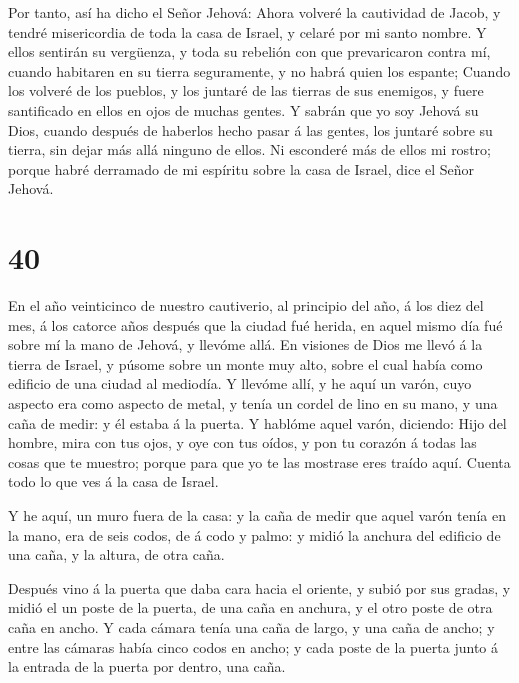  Por tanto, así ha dicho el Señor Jehová: Ahora volveré la
cautividad de Jacob, y tendré misericordia de toda la casa de Israel, y
celaré por mi santo nombre.  Y ellos sentirán su vergüenza,
y toda su rebelión con que prevaricaron contra mí, cuando habitaren en
su tierra seguramente, y no habrá quien los espante; 
Cuando los volveré de los pueblos, y los juntaré de las tierras de sus
enemigos, y fuere santificado en ellos en ojos de muchas gentes.
 Y sabrán que yo soy Jehová su Dios, cuando después de
haberlos hecho pasar á las gentes, los juntaré sobre su tierra, sin
dejar más allá ninguno de ellos.  Ni esconderé más de ellos
mi rostro; porque habré derramado de mi espíritu sobre la casa de
Israel, dice el Señor Jehová.

\hypertarget{section-39}{%
\section{40}\label{section-39}}

 En el año veinticinco de nuestro cautiverio, al principio
del año, á los diez del mes, á los catorce años después que la ciudad
fué herida, en aquel mismo día fué sobre mí la mano de Jehová, y llevóme
allá.  En visiones de Dios me llevó á la tierra de Israel, y
púsome sobre un monte muy alto, sobre el cual había como edificio de una
ciudad al mediodía.  Y llevóme allí, y he aquí un varón,
cuyo aspecto era como aspecto de metal, y tenía un cordel de lino en su
mano, y una caña de medir: y él estaba á la puerta.  Y
hablóme aquel varón, diciendo: Hijo del hombre, mira con tus ojos, y oye
con tus oídos, y pon tu corazón á todas las cosas que te muestro; porque
para que yo te las mostrase eres traído aquí. Cuenta todo lo que ves á
la casa de Israel.

 Y he aquí, un muro fuera de la casa: y la caña de medir que
aquel varón tenía en la mano, era de seis codos, de á codo y palmo: y
midió la anchura del edificio de una caña, y la altura, de otra caña.

 Después vino á la puerta que daba cara hacia el oriente, y
subió por sus gradas, y midió el un poste de la puerta, de una caña en
anchura, y el otro poste de otra caña en ancho.  Y cada
cámara tenía una caña de largo, y una caña de ancho; y entre las cámaras
había cinco codos en ancho; y cada poste de la puerta junto á la entrada
de la puerta por dentro, una caña.

